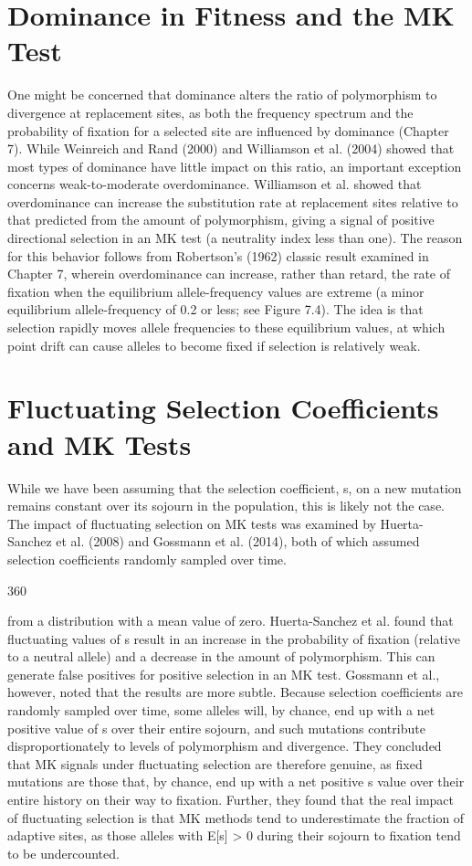 \documentclass{article}
\begin{document}
\section{Dominance in Fitness and the MK Test}
One might be concerned that dominance alters the ratio of polymorphism to divergence at replacement sites, as both the frequency spectrum and the probability of fixation for a selected site are influenced by dominance (Chapter 7). While Weinreich and Rand (2000) and Williamson et al. (2004) showed that most types of dominance have little impact on this ratio, an important exception concerns weak-to-moderate overdominance. Williamson et al. showed that overdominance can increase the substitution rate at replacement sites relative to that predicted from the amount of polymorphism, giving a signal of positive directional selection in an MK test (a neutrality index less than one). The reason for this behavior follows from Robertson's (1962) classic result examined in Chapter 7, wherein overdominance can increase, rather than retard, the rate of fixation when the equilibrium allele-frequency values are extreme (a minor equilibrium allele-frequency of 0.2 or less; see Figure 7.4). The idea is that selection rapidly moves allele frequencies to these equilibrium values, at which point drift can cause alleles to become fixed if selection is relatively weak.

\section{Fluctuating Selection Coefficients and MK Tests}
While we have been assuming that the selection coefficient, s, on a new mutation remains constant over its sojourn in the population, this is likely not the case. The impact of fluctuating selection on MK tests was examined by Huerta-Sanchez et al. (2008) and Gossmann et al. (2014), both of which assumed selection coefficients randomly sampled over time.

360

from a distribution with a mean value of zero. Huerta-Sanchez et al. found that fluctuating values of s result in an increase in the probability of fixation (relative to a neutral allele) and a decrease in the amount of polymorphism. This can generate false positives for positive selection in an MK test. Gossmann et al., however, noted that the results are more subtle. Because selection coefficients are randomly sampled over time, some alleles will, by chance, end up with a net positive value of s over their entire sojourn, and such mutations contribute disproportionately to levels of polymorphism and divergence. They concluded that MK signals under fluctuating selection are therefore genuine, as fixed mutations are those that, by chance, end up with a net positive s value over their entire history on their way to fixation. Further, they found that the real impact of fluctuating selection is that MK methods tend to underestimate the fraction of adaptive sites, as those alleles with E[s] > 0 during their sojourn to fixation tend to be undercounted.
\end{document}
